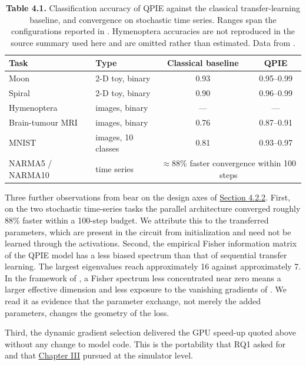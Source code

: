 \documentclass{report}
\theoremstyle{plain}
\theoremstyle{definition}
\theoremstyle{remark}
\begin{document}
\begin{table}[htbp]
\caption{\textbf{Table 4.1.} Classification accuracy of QPIE against the classical transfer-learning baseline, and convergence on stochastic time series. Ranges span the configurations reported in \cite{guo2025qpie}. Hymenoptera accuracies are not reproduced in the source summary used here and are omitted rather than estimated. Data from \cite{guo2025qpie}.}\label{tab:qml:qpie-results}
 
\small
\begin{tabular}{llcc}
\toprule
Task & Type & Classical baseline & QPIE \\
\midrule
Moon & 2-D toy, binary & 0.93 & 0.95--0.99 \\
Spiral & 2-D toy, binary & 0.90 & 0.96--0.99 \\
Hymenoptera & images, binary & --- & --- \\
Brain-tumour MRI & images, binary & 0.76 & 0.87--0.91 \\
MNIST & images, 10 classes & 0.81 & 0.93--0.97 \\
\midrule
NARMA5 / NARMA10 & time series & \multicolumn{2}{c}{$\approx$88\% faster convergence within 100 steps} \\
\bottomrule
\end{tabular}
\end{table}

Three further observations from \cite{guo2025qpie} bear on the design axes of \hyperref[sec:qml:prelim:axes]{Section 4.2.2}. First, on the two stochastic time-series tasks the parallel architecture converged roughly 88\% faster within a 100-step budget. We attribute this to the transferred parameters, which are present in the circuit from initialization and need not be learned through the activations. Second, the empirical Fisher information matrix of the QPIE model has a less biased spectrum than that of sequential transfer learning. The largest eigenvalues reach approximately 16 against approximately 7. In the framework of \cite{abbas2021powerqnn}, a Fisher spectrum less concentrated near zero means a larger effective dimension and less exposure to the vanishing gradients of \cite{mcclean2018barren}. We read it as evidence that the parameter exchange, not merely the added parameters, changes the geometry of the loss.

Third, the dynamic gradient selection delivered the GPU speed-up quoted above without any change to model code. This is the portability that RQ1 asked for and that \hyperref[ch:qgear]{Chapter III} pursued at the simulator level.
\end{document}
